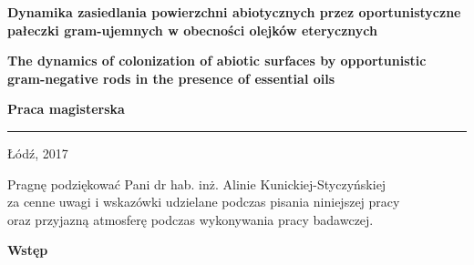 \documentclass[11pt,a4paper]{report}
\begin{document}
\begin{titlepage}
\vskip 12pt
\vskip 12pt
\begin{center}
{\bf \huge Dynamika zasiedlania powierzchni abiotycznych przez oportunistyczne pałeczki gram-ujemnych w obecności olejków eterycznych}
\end{center}
\begin{center}
{\bf \Large The dynamics of colonization of abiotic surfaces by opportunistic gram-negative rods in the presence of essential oils}
\vskip 30pt
\end{center}
\begin{spacing}{1.1}
\vskip 12pt
\vskip 12pt
\begin{flushleft}
{\bf \Large Praca magisterska}
\end{flushleft}
\vskip 62pt
\begin{flushleft}
\vskip -46pt
\vskip -8pt
\end{flushleft}
\end{spacing}
\vfill
\noindent
\rule[-2pt]{\textwidth}{.1mm}
\begin{center}
Łódź, 2017
\end{center}
\end{titlepage}
\newpage
\null
\vskip 380pt
\begin{flushright}
Pragnę podziękować Pani dr hab. inż. Alinie Kunickiej-Styczyńskiej\\
za cenne uwagi i wskazówki udzielane podczas pisania niniejszej pracy\\
oraz przyjazną atmosferę podczas wykonywania pracy badawczej.
\end{flushright}

\begin{spacing}{1}
\tableofcontents
\end{spacing}

\newpage
\vskip 36pt
\vskip 36pt
\vskip 36pt
\vskip 36pt
\vskip 36pt
\vskip 36pt
\begin{center}
{\bf \huge Wstęp}\\
\end{center}
\vskip 36pt
\end{document}
